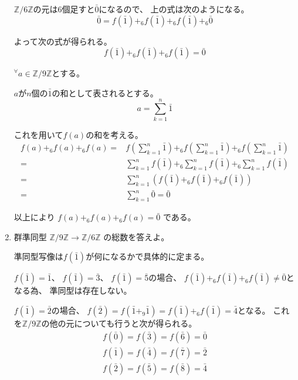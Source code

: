 \documentclass[12pt,b5paper]{ltjsarticle}
\begin{document}
\begin{enumerate}
      $\mathbb{Z}/6\mathbb{Z}$の元は6個足すと$\bar{0}$になるので、
      上の式は次のようになる。
      \begin{equation}
       \bar{0} = f(\bar{1}) +_{6} f(\bar{1}) +_{6} f(\bar{1})+_{6} \bar{0}
      \end{equation}

      よって次の式が得られる。
      \begin{equation}
       f(\bar{1}) +_{6} f(\bar{1}) +_{6} f(\bar{1}) = \bar{0}
      \end{equation}

      ${}^{\forall}a\in\mathbb{Z}/9\mathbb{Z}$とする。

      $a$が$n$個の$\bar{1}$の和として表されるとする。
      \begin{equation}
       a=\sum_{k=1}^{n}\bar{1}
      \end{equation}

      これを用いて$f(a)$の和を考える。
      \begin{align}
       f(a) +_{6} f(a) +_{6} f(a)
       =& f\left( \sum_{k=1}^{n}\bar{1} \right)
       +_{6} f\left( \sum_{k=1}^{n}\bar{1} \right)
       +_{6} f\left( \sum_{k=1}^{n}\bar{1} \right)\\
       =& \sum_{k=1}^{n}f(\bar{1})
       +_{6} \sum_{k=1}^{n}f(\bar{1})
       +_{6} \sum_{k=1}^{n}f(\bar{1})\\
       =& \sum_{k=1}^{n}(f(\bar{1}) +_{6} f(\bar{1}) +_{6} f(\bar{1}))\\
       =& \sum_{k=1}^{n}\bar{0} = \bar{0}
      \end{align}

      以上により
      $f(a) +_{6} f(a) +_{6} f(a) = \bar{0}$
      である。

\hrulefill
 \item
      群準同型
      $\mathbb{Z}/9\mathbb{Z}\to\mathbb{Z}/6\mathbb{Z}$
      の総数を答えよ。

\dotfill

      準同型写像は$f(\bar{1})$が何になるかで具体的に定まる。

      $f(\bar{1})=\bar{1}$、
      $f(\bar{1})=\bar{3}$、
      $f(\bar{1})=\bar{5}$の場合、
      $f(\bar{1})+_{6}f(\bar{1})+_{6}f(\bar{1})\ne\bar{0}$となる為、
      準同型は存在しない。

      $f(\bar{1})=\bar{2}$の場合、
      $f(\bar{2})=f(\bar{1}+_{9}\bar{1})=f(\bar{1})+_{6}f(\bar{1})=\bar{4}$となる。
      これを$\mathbb{Z}/9\mathbb{Z}$の他の元についても行うと次が得られる。
      \begin{gather}
       f(\bar{0}) = f(\bar{3}) = f(\bar{6}) = \bar{0}\\
       f(\bar{1}) = f(\bar{4}) = f(\bar{7}) = \bar{2}\\
       f(\bar{2}) = f(\bar{5}) = f(\bar{8}) = \bar{4}
      \end{gather}


\end{enumerate}
\end{document}
